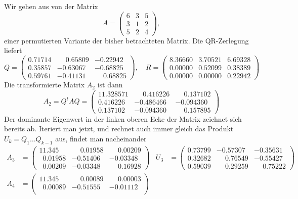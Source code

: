 \begin{beispiel}
Wir gehen aus von der Matrix
\[
A=\begin{pmatrix}
6&3&5\\
3&1&2\\
5&2&4
\end{pmatrix},
\]
einer permutierten Variante der bisher betrachteten Matrix.
Die QR-Zerlegung liefert
\[
Q=\begin{pmatrix}
   0.71714&  \phantom{-}0.65809& -0.22942\\
   0.35857& -0.63067& -0.68825\\
   0.59761& -0.41131& \phantom{-}0.68825
\end{pmatrix},
\quad
R=\begin{pmatrix}
   8.36660&  3.70521&  6.69328\\
   0.00000&  0.52099&  0.38389\\
   0.00000&  0.00000&  0.22942
\end{pmatrix}
\]
Die transformierte Matrix $A_2$ ist dann
\[
A_2=Q^tAQ=\begin{pmatrix}
   11.328571&  \phantom{-}0.416226&  \phantom{-}0.137102\\
    0.416226&  -0.486466&  -0.094360\\
    0.137102&  -0.094360&  \phantom{-}0.157895
\end{pmatrix}
\]
Der dominante Eigenwert in der linken oberen Ecke der Matrix zeichnet
sich bereits ab.
Iteriert man jetzt, und rechnet auch immer gleich
das Produkt $U_k=Q_1\dots Q_{k-1}$ aus, findet man nacheinander
\begin{align*}
A_3&=\begin{pmatrix}
             11.345\phantom{00}&  \phantom{-}0.01958&   \phantom{-}0.00209\\
   \phantom{0}0.01958          &  -0.51406&  -0.03348\\
   \phantom{0}0.00209          &  -0.03348&  \phantom{-}0.16928
\end{pmatrix}&
U_3&=\begin{pmatrix}
   0.73799& -0.57307& -0.35631\\
   0.32682& \phantom{-}0.76549& -0.55427\\
   0.59039& \phantom{-}0.29259& \phantom{-}0.75222
\end{pmatrix}
\\
A_4&=\begin{pmatrix}
   11.345\phantom{00} &  \phantom{-}0.00089&  \phantom{-}0.00003\\
   \phantom{0}0.00089& -0.51555& -0.01112\\

\end{pmatrix}
\end{align*}
\end{beispiel}
